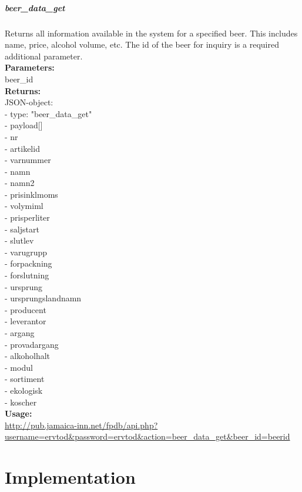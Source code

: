 \documentclass{article}
\begin{document}
\subsubsection{beer\_data\_get}
Returns all information available in the system for a specified beer. This includes name, price, alcohol volume, etc. The id of the beer for inquiry is a required additional parameter.\\
\textbf{Parameters:}\\
beer\_id\\
\textbf{Returns:}\\
JSON-object:\\
- type: "beer\_data\_get"\\
- payload[]\\
\indent - nr\\
\indent - artikelid\\
\indent - varnummer\\
\indent - namn\\
\indent - namn2\\
\indent - prisinklmoms\\
\indent - volymiml\\
\indent - prisperliter\\
\indent - saljstart\\
\indent - slutlev\\
\indent - varugrupp\\
\indent - forpackning\\
\indent - forslutning\\
\indent - ursprung\\
\indent - ursprungslandnamn\\
\indent - producent\\
\indent - leverantor\\
\indent - argang\\
\indent - provadargang\\
\indent - alkoholhalt\\
\indent - modul\\
\indent - sortiment\\
\indent - ekologisk\\
\indent - koscher\\
\textbf{Usage:}\\
\url{http://pub.jamaica-inn.net/fpdb/api.php?username=ervtod\&password=ervtod\&action=beer\_data\_get\&beer\_id=beerid}\\



\part{Implementation}
\end{document}
